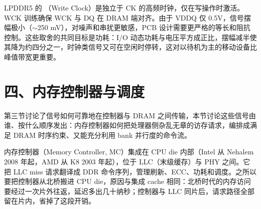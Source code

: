 LPDDR5 的 （Write Clock）是独立于 CK 的高频时钟，仅在写操作时激活。WCK 训练确保 WCK 与 DQ 在 DRAM 端对齐。由于 VDDQ 仅 0.5V，信号摆幅极小（$\sim$250 mV），对噪声和串扰更敏感，PCB 设计需要更严格的等长和阻抗控制。这些取舍的共同目标是功耗：I/O 动态功耗与电压平方成正比，摆幅减半使其降为约四分之一，时钟类信号又可在空闲时停转，这对以待机为主的移动设备比峰值带宽更重要。

\section{四、内存控制器与调度}


第三节讨论了信号如何可靠地在控制器与 DRAM 之间传输，本节讨论这些信号由谁、按什么顺序发出：内存控制器如何把处理器侧杂乱无章的访存请求，编排成满足 DRAM 时序约束、又能充分利用 bank 并行度的命令流。

内存控制器（Memory Controller, MC）集成在 CPU die 内部（Intel 从 Nehalem 2008 年起，AMD 从 K8 2003 年起），位于 LLC（末级缓存）与 PHY 之间。它把 LLC miss 请求翻译成 DDR 命令序列，管理刷新、ECC、功耗和调度。之所以要把控制器从北桥搬进 CPU die，原因与集成 cache 相同：北桥时代的内存访问要经过一次片外往返，延迟多出几十纳秒；控制器与 LLC 同片后，请求路径全部留在片内，省掉了这段开销。

